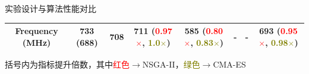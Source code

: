 \documentclass[10pt]{beamer}
\begin{document}
\begin{frame}{实验设计与算法性能对比}
\begin{table}
\begin{adjustbox}{width=1.1\textwidth,center}
\begin{tabular}{c|c c| c c c c c}
      Frequency	(MHz)	 	 & 733  (688)   & 708 	 &711  (\textcolor{red}{0.97$\times$}, \textcolor{olive}{1.0$\times$})		        & 585 	(\textcolor{red}{0.80$\times$}, \textcolor{olive}{0.83$\times$})	& - 	      	                                                              & - 	                                                                           & 693 (\textcolor{red}{0.95$\times$}, \textcolor{olive}{0.98$\times$}) \\
      \bottomrule
      \end{tabular}
    \end{adjustbox}
  \end{table}

  {\fontsize{7}{10}\selectfont
   括号内为指标提升倍数，其中\textcolor{red}{红色}$\rightarrow$NSGA-II，\textcolor{olive}{绿色}$\rightarrow$CMA-ES
  }

\end{frame}
\end{document}
